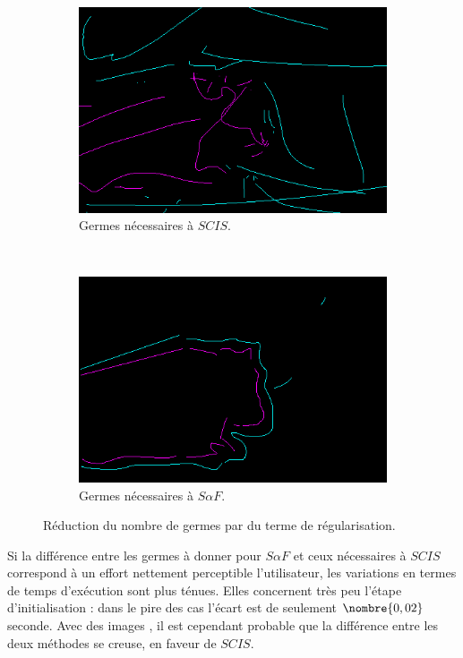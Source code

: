 \begin{figure}[htb]
\centering
 \begin{subfigure}{0.4\textwidth}	
\includegraphics[width=\textwidth]{images/evaluation/seeds_SCIS}
		 \caption{Germes nécessaires à $SCIS$.}
 \end{subfigure}
 ~
 \begin{subfigure}{0.4\textwidth}	
\includegraphics[width=\textwidth]{images/evaluation/seeds_SAF}
		 \caption{Germes nécessaires à $S \alpha F$.}
 \end{subfigure}
 \caption{Réduction du nombre de germes par  du terme de régularisation.}
 \label{fig:eval:seedsComparison}
\end{figure} 

Si la différence entre les germes à donner pour $S \alpha F$ et ceux nécessaires à $SCIS$ correspond à un effort nettement perceptible  l'utilisateur, les variations en termes de temps d'exécution sont plus ténues. Elles concernent très peu l'étape d'initialisation : dans le pire des cas l'écart est de seulement $\nombre{0,02}$ seconde. Avec des images , il est cependant probable que la différence entre les deux méthodes se creuse, en faveur de $SCIS$. 

